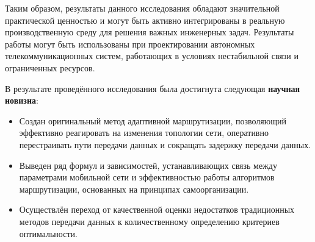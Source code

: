 Таким образом, результаты данного исследования обладают значительной практической ценностью и могут быть активно интегрированы в реальную производственную среду для решения важных инженерных задач.
Результаты работы могут быть использованы при проектировании автономных телекоммуникационных систем, работающих в условиях нестабильной связи и ограниченных ресурсов.

В результате проведённого исследования была достигнута следующая \textbf{научная новизна}:
\begin{itemize}
    \item Создан оригинальный метод адаптивной маршрутизации, позволяющий эффективно реагировать на изменения топологии сети, оперативно перестраивать пути передачи данных и сокращать задержку передачи данных.
    \item Выведен ряд формул и зависимостей, устанавливающих связь между параметрами мобильной сети и эффективностью работы алгоритмов маршрутизации, основанных на принципах самоорганизации.
    \item Осуществлён переход от качественной оценки недостатков традиционных методов передачи данных к количественному определению критериев оптимальности.
\end{itemize}





